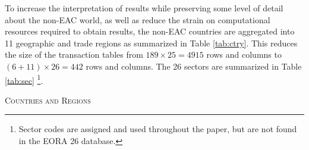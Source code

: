 \documentclass[a4paper]{article}
\begin{document}
To increase the interpretation of results while preserving some level of detail about the non-EAC world, as well as reduce the strain on computational resources required to obtain results, the non-EAC countries are aggregated into 11 geographic and trade regions as summarized in Table \ref{tab:ctry}. This reduces the size of the transaction tables from $189 \times 25 = 4915$ rows and columns to $(6 + 11)\times 26 = 442$ rows and columns. The 26 sectors are summarized in Table \ref{tab:sec} \footnote{Sector codes are assigned and used throughout the paper, but are not found in the EORA 26 database.}. \newline







\begin{table}[h!]
\centering
\caption{\textsc{Countries and Regions}}


\end{table}
\end{document}
